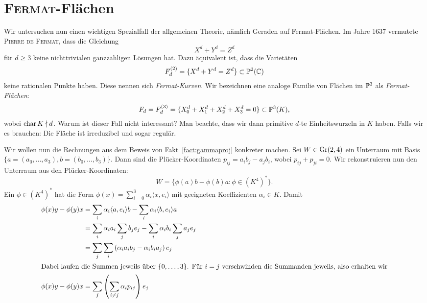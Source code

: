 \chapter{\textsc{Fermat}-Flächen} \label{chap:fermat}
Wir untersuchen nun einen wichtigen Spezialfall der allgemeinen Theorie, nämlich Geraden auf Fermat-Flächen. Im Jahre 1637 vermutete \textsc{Pierre de Fermat}, dass die Gleichung
\begin{equation*}
X^d + Y^d = Z^d
\end{equation*}
für $d \geq 3$ keine nichttrivialen ganzzahligen Lösungen hat. Dazu äquivalent ist, dass die Varietäten
\begin{equation*}
F_d^{(2)} = \{ X^d + Y^d = Z^d \} \subset \mathbb P^{2}(\mathbb C)
\end{equation*}
keine rationalen Punkte haben. Diese nennen sich \emph{Fermat-Kurven}. Wir bezeichnen eine analoge Familie von Flächen im $\mathbb P^{3}$ als \emph{Fermat-Flächen}:
\begin{equation}
F_d = F_d^{(3)} = \{ X_0^d + X_1^d + X_2^d + X_3^d = 0 \} \subset \mathbb P^{3}(K),
\end{equation}
wobei $\operatorname{char} K \nmid d$. \note Warum ist dieser Fall nicht interessant? Man beachte, dass wir dann primitive $d$-te Einheitswurzeln in $K$ haben.
\todo Falls wir es brauchen: Die Fläche ist irreduzibel und sogar regulär.

Wir wollen nun die Rechnungen aus dem Beweis von Fakt~\ref{fact:gammaproj} konkreter machen. Sei $W \in \grass 2/4$ ein Unterraum mit Basis $\{a = (a_0, \dots, a_3), b = (b_0, \dots, b_3)\}$. Dann sind die Plücker-Koordinaten $p_{ij} = a_i b_j - a_j b_i$, wobei $p_{ij} + p_{ji} = 0$. Wir rekonstruieren nun den Unterraum aus den Plücker-Koordinaten:
\begin{equation}
W = \{ \phi(a)b - \phi(b)a \colon \phi \in (K^4)^* \}.
\end{equation}
Ein $\phi \in (K^4)^*$ hat die Form $\phi(x) = \sum_{i=0}^3 \alpha_i \langle x, e_i \rangle$ mit geeigneten Koeffizienten $\alpha_i \in K$. Damit
\begin{align*}
\phi(x)y - \phi(y)x &= \sum_i \alpha_i \langle a, e_i \rangle b - \sum_i \alpha_i \langle b, e_i \rangle a \\
	&= \sum_i \alpha_i a_i \sum_j b_j e_j - \sum_i \alpha_i b_i \sum_j a_j e_j \\
	&= \sum_j \sum_i \left(\alpha_i a_i b_j - \alpha_i b_i a_j \right) e_j \\
\intertext{Dabei laufen die Summen jeweils über $\{0,\dots,3\}$. Für $i=j$ verschwinden die Summanden jeweils, also erhalten wir}
\phi(x)y - \phi(y)x &= \sum_j \left(\sum_{i \neq j} \alpha_i p_{ij} \right) e_j
\end{align*}

